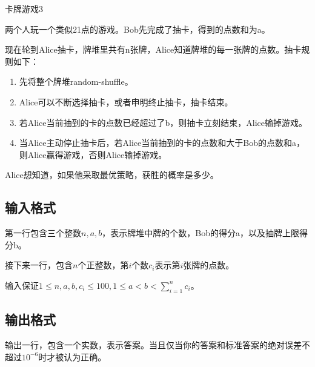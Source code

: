 \begin{Problem}{卡牌游戏}{3}

两个人玩一个类似21点的游戏。Bob先完成了抽卡，得到的点数和为a。

现在轮到Alice抽卡，牌堆里共有n张牌，Alice知道牌堆的每一张牌的点数。抽卡规则如下：

\begin{enumerate}
\item 先将整个牌堆random-shuffle。
\item Alice可以不断选择抽卡，或者申明终止抽卡，抽卡结束。
\item 若Alice当前抽到的卡的点数已经超过了b，则抽卡立刻结束，Alice输掉游戏。
\item 当Alice主动停止抽卡后，若Alice当前抽到的卡的点数和大于Bob的点数和a，则Alice赢得游戏，否则Alice输掉游戏。
\end{enumerate}

Alice想知道，如果他采取最优策略，获胜的概率是多少。

\subsection*{输入格式}

第一行包含三个整数$n,a,b$，表示牌堆中牌的个数，Bob的得分a，以及抽牌上限得分b。

接下来一行，包含$n$个正整数，第$i$个数$c_i$表示第$i$张牌的点数。

输入保证$1 \leq n,a,b,c_i \leq 100, 1 \leq a < b < \sum_{i=1}^n c_i$。

\subsection*{输出格式}

输出一行，包含一个实数，表示答案。当且仅当你的答案和标准答案的绝对误差不超过$10^{-6}$时才被认为正确。


\end{Problem}
